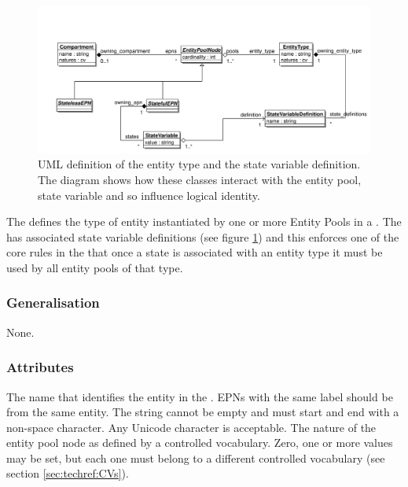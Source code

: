 \begin{figure}[htb]
  \centering
  \includegraphics[width=\textwidth]{images/entitytypeuml}
\caption{UML definition of the entity type and the state variable
  definition. The diagram shows how these classes interact with the
  entity pool, state variable and so influence
   logical identity.}
  \label{fig:techref:entitytypeuml}
\end{figure}

The  defines the type of entity instantiated by one or more Entity
Pools in a \PDm. The  has associated state
variable definitions (see figure \ref{fig:techref:entitytypeuml}) and
this enforces one of the core rules in the \PDl that once a state is
associated with an entity type it must be used by all entity pools of
that type.


\subsubsection{Generalisation}

None.

\subsubsection{Attributes}

\begin{attributes}
   The name that identifies the entity in the
  \PDm. EPNs with the same label should be from the same entity. The
  string cannot be empty and must start and end with a non-space
  character. Any Unicode character is acceptable.
   The nature of the entity pool node as defined
  by a controlled vocabulary. Zero, one or more values may be set, but
  each one must belong to a different controlled vocabulary (see
  section \ref{sec:techref:CVs}).
\end{attributes}


